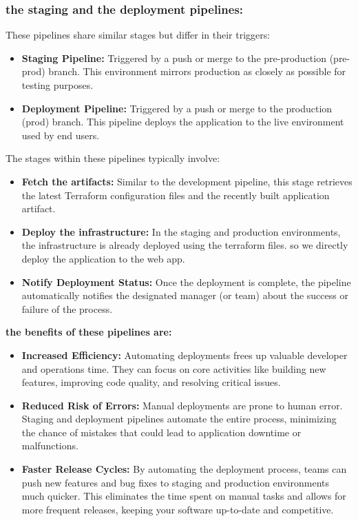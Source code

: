 \subsubsection*{the staging and the deployment pipelines:}
\noindent These pipelines share similar stages but differ in their triggers:
\begin{itemize}
    \item \textbf{Staging Pipeline:} Triggered by a push or merge to the pre-production (pre-prod) branch. This environment mirrors production as closely as possible for testing purposes.
    \item \textbf{Deployment Pipeline:} Triggered by a push or merge to the production (prod) branch. This pipeline deploys the application to the live environment used by end users.
\end{itemize}
\noindent The stages within these pipelines typically involve:
\begin{itemize}
    \item \textbf{Fetch the artifacts:} Similar to the development pipeline, this stage retrieves the latest Terraform configuration files and the recently built application artifact.
    \item \textbf{Deploy the infrastructure:} In the staging and production environments, the infrastructure is already deployed using the terraform files. so we directly deploy the application to the web app.
    \item \textbf{Notify Deployment Status:} Once the deployment is complete, the pipeline automatically notifies the designated manager (or team) about the success or failure of the process.
\end{itemize}
\textbf{the benefits of these pipelines are:}
\begin{itemize}
    \item \textbf{Increased Efficiency:} Automating deployments frees up valuable developer and operations time. They can focus on core activities like building new features, improving code quality, and resolving critical issues.
    \item \textbf{Reduced Risk of Errors:} Manual deployments are prone to human error. Staging and deployment pipelines automate the entire process, minimizing the chance of mistakes that could lead to application downtime or malfunctions.
    \item \textbf{Faster Release Cycles:} By automating the deployment process, teams can push new features and bug fixes to staging and production environments much quicker. This eliminates the time spent on manual tasks and allows for more frequent releases, keeping your software up-to-date and competitive.
\end{itemize}
